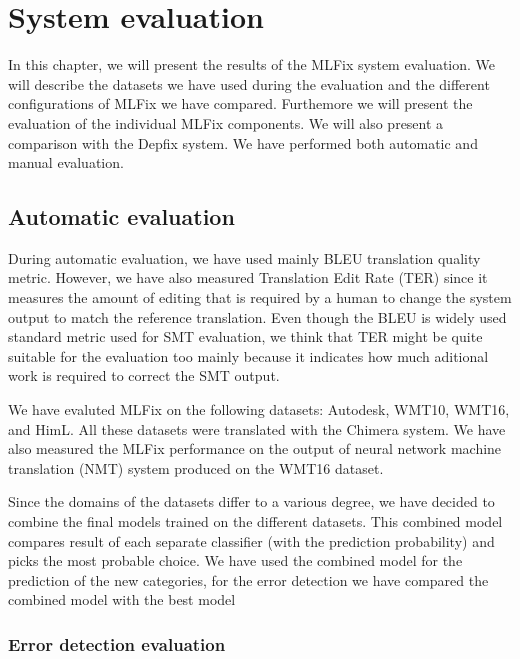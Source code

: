 \chapter{System evaluation}
\label{chap:eval}

In this chapter, we will present the results of the MLFix system evaluation.
We will describe the datasets we have used during the evaluation and the different
configurations of MLFix we have compared. Furthemore we will present the evaluation
of the individual MLFix components.
We will also present a comparison with the Depfix
system. We have performed both automatic and manual evaluation.

\section{Automatic evaluation}

During automatic evaluation, we have used mainly BLEU\cite{papineni:2002} translation quality metric. However, we have also
measured Translation Edit Rate\cite{Snover06astudy} (TER) since it measures the amount of editing that is required by a human
to change the system output to match the reference translation. Even though the BLEU is widely used standard metric
used for SMT evaluation, we think that TER might be quite suitable for the evaluation too mainly because it indicates
how much aditional work is required to correct the SMT output.

We have evaluted MLFix on the following datasets: Autodesk, WMT10, WMT16, and HimL. All these datasets
were translated with the Chimera system. We have also measured the MLFix performance on the output of neural network
machine translation (NMT) system produced on the WMT16 dataset.

Since the domains of the datasets differ to a various degree, we have decided to combine the final models trained
on the different datasets. This combined model
compares result of each separate classifier (with the prediction probability) and picks the most probable choice.
We have used the combined model for the prediction of the new categories, for the error detection we have compared
the combined model with the best model


\subsection{Error detection evaluation}


